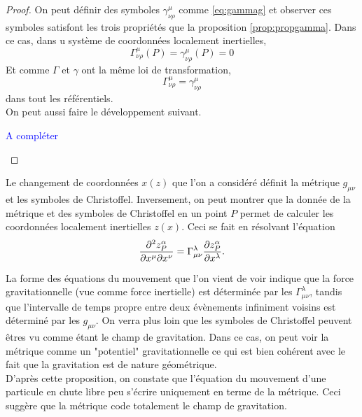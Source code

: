 \documentclass[a4paper,11pt]{report}
\theoremstyle{definition}
\theoremstyle{plain}
\theoremstyle{definition}
\theoremstyle{remark}
\newcommand{\comp}{\begin{center}\textcolor{blue}{A compléter}\end{center}}
\begin{document}
            \begin{proof}
                On peut définir des symboles $\gamma^\mu_{\nu\rho}$ comme \ref{eq:gammag} et observer ces symboles satisfont les trois propriétés que la proposition \ref{prop:propgamma}. Dans ce cas, dans u système de coordonnées localement inertielles,
                \begin{equation}
                    \Gamma^\mu_{\nu\rho}(P) = \gamma^\mu_{\nu\rho}(P) = 0
                \end{equation}
                Et comme $\Gamma$ et $\gamma$ ont la même loi de transformation, 
                \begin{equation}
                    \Gamma^\mu_{\nu\rho} = \gamma^\mu_{\nu\rho}
                \end{equation}
                dans tout les référentiels.\\
                
                On peut aussi faire le développement suivant. 
                \comp
            \end{proof}
            
            Le changement de coordonnées $x(z)$ que l'on a considéré définit la métrique $g_{\mu\nu}$ et les symboles de Christoffel. Inversement, on peut montrer que la donnée de la métrique et des symboles de Christoffel en un point $P$ permet de calculer les coordonnées localement inertielles $z(x)$. Ceci se fait en résolvant l'équation
            \begin{equation}
                \pdv{z^\alpha_P}{x^\mu}{x^\nu} = \Gamma^\lambda_{\mu\nu}\pdv{z^\alpha_P}{x^\lambda}.
            \end{equation}
            
            La forme des équations du mouvement que l'on vient de voir indique que la force gravitationnelle (vue comme force inertielle) est déterminée par les $\Gamma^\lambda_{\mu\nu}$, tandis que l'intervalle de temps propre entre deux évènements infiniment voisins est déterminé par les $g_{\mu\nu}$. On verra plus loin que les symboles de Christoffel peuvent êtres vu comme étant le champ de gravitation. Dans ce cas, on peut voir la métrique comme un "potentiel" gravitationnelle ce qui est bien cohérent avec le fait que la gravitation est de nature géométrique.\\
            
            D'après cette proposition, on constate que l'équation du mouvement d'une particule en chute libre peu s'écrire uniquement en terme de la métrique. Ceci suggère que la métrique code totalement le champ de gravitation.
            
\end{document}
